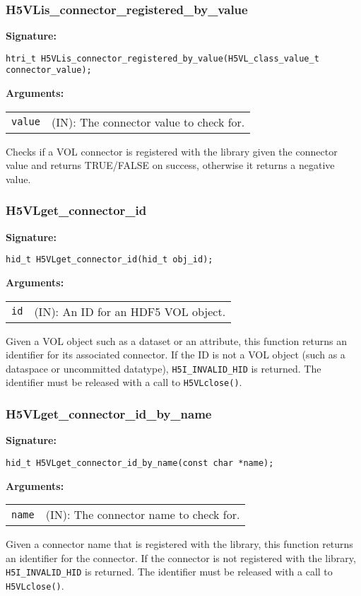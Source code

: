 \subsubsection{H5VLis\_connector\_registered\_by\_value}
\begin{mdframed}[style=bgbox]
\textbf{Signature:}
\begin{lstlisting}
htri_t H5VLis_connector_registered_by_value(H5VL_class_value_t connector_value);
\end{lstlisting}
\textbf{Arguments:}\\
\begin{tabular}{l p{13.5cm}}
  {\tt value} & (IN): The connector value to check for.\\
\end{tabular}
\end{mdframed}
Checks if a VOL connector is registered with the library given the connector value and returns TRUE/FALSE on success, otherwise it returns a negative value.
\bigskip


\subsubsection{H5VLget\_connector\_id}
\begin{mdframed}[style=bgbox]
\textbf{Signature:}
\begin{lstlisting}
hid_t H5VLget_connector_id(hid_t obj_id);
\end{lstlisting}
\textbf{Arguments:}\\
\begin{tabular}{l p{13.5cm}}
  {\tt id} & (IN): An ID for an HDF5 VOL object.\\
\end{tabular}
\end{mdframed}
Given a VOL object such as a dataset or an attribute, this function returns an identifier for its associated connector. If the ID is not a VOL object (such as a dataspace or uncommitted datatype), \texttt{H5I\_INVALID\_HID} is returned. The identifier must be released with a call to {\tt H5VLclose()}.
\bigskip


\subsubsection{H5VLget\_connector\_id\_by\_name}
\begin{mdframed}[style=bgbox]
\textbf{Signature:}
\begin{lstlisting}
hid_t H5VLget_connector_id_by_name(const char *name);
\end{lstlisting}
\textbf{Arguments:}\\
\begin{tabular}{l p{13.5cm}}
  {\tt name} & (IN): The connector name to check for.\\
\end{tabular}
\end{mdframed}
Given a connector name that is registered with the library, this function returns an identifier for the connector. If the connector is not registered with the library, \texttt{H5I\_INVALID\_HID} is returned. The identifier must be released with a call to {\tt H5VLclose()}.
\bigskip


